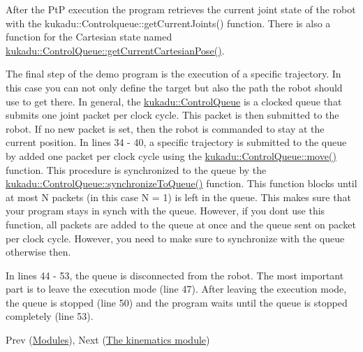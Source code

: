 After the Pt\-P execution the program retrieves the current joint state of the robot with the kukadu\-::\-Controlqueue\-::get\-Current\-Joints() function. There is also a function for the Cartesian state named \hyperlink{classkukadu_1_1ControlQueue_a9e79e1d0d9697bbf146d66a2d01fea9e}{kukadu\-::\-Control\-Queue\-::get\-Current\-Cartesian\-Pose()}.

The final step of the demo program is the execution of a specific trajectory. In this case you can not only define the target but also the path the robot should use to get there. In general, the \hyperlink{classkukadu_1_1ControlQueue}{kukadu\-::\-Control\-Queue} is a clocked queue that submits one joint packet per clock cycle. This packet is then submitted to the robot. If no new packet is set, then the robot is commanded to stay at the current position. In lines 34 -\/ 40, a specific trajectory is submitted to the queue by added one packet per clock cycle using the \hyperlink{classkukadu_1_1ControlQueue_aca70a978b2950d7c9ab99d55c5977eec}{kukadu\-::\-Control\-Queue\-::move()} function. This procedure is synchronized to the queue by the \hyperlink{classkukadu_1_1ControlQueue_a324484e79a5505656a32d9f32054e5d0}{kukadu\-::\-Control\-Queue\-::synchronize\-To\-Queue()} function. This function blocks until at most N packets (in this case N = 1) is left in the queue. This makes sure that your program stays in synch with the queue. However, if you dont use this function, all packets are added to the queue at once and the queue sent on packet per clock cycle. However, you need to make sure to synchronize with the queue otherwise then.

In lines 44 -\/ 53, the queue is disconnected from the robot. The most important part is to leave the execution mode (line 47). After leaving the execution mode, the queue is stopped (line 50) and the program waits until the queue is stopped completely (line 53).

Prev (\hyperlink{modulespage}{Modules}), Next (\hyperlink{kinematicspage}{The kinematics module}) 
